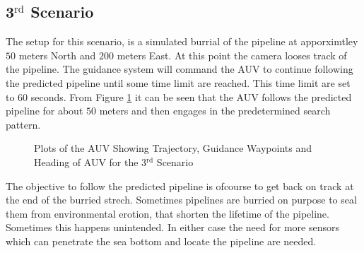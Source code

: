 	\subsection{3$^{\mathrm{rd}}$ Scenario}
		The setup for this scenario, is a simulated burrial of the pipeline at apporximtley $50$
		meters North and $200$ meters East. At this point the camera looses track of the pipeline. The
		guidance system will command the AUV to continue following the predicted pipeline until some
		time limit are reached. This time limit are set to $60$ seconds. From Figure
		\ref{fig:ch3_3rd_NE_plots} it can be seen that the AUV follows the predicted pipeline for
		about $50$ meters and then engages in the predetermined search pattern.
		\begin{figure}[htbp]
			\centering
			\caption{Plots of the AUV Showing Trajectory, Guidance Waypoints and Heading of AUV
			for the 3$^{\mathrm{rd}}$ Scenario}
			\label{fig:ch3_3rd_NE_plots}
		\end{figure}
		
		The objective to follow the predicted pipeline is ofcourse to get back on track at the end of
		the burried strech. Sometimes pipelines are burried on purpose to seal them from environmental
		erotion, that shorten the lifetime of the pipeline. Sometimes this happens unintended. In
		either case the need for more sensors which can penetrate the sea bottom and locate the
		pipeline are needed. 

